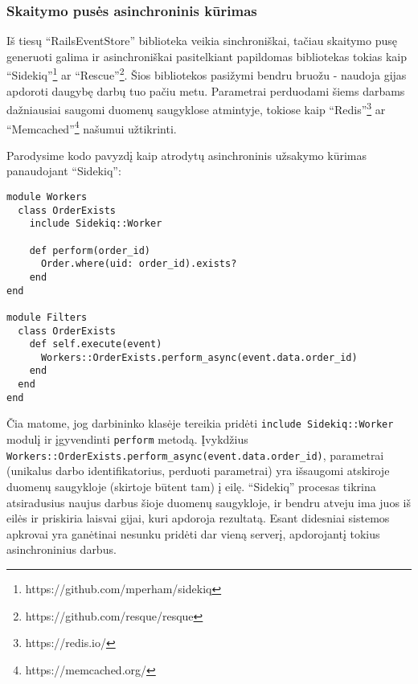 

\subsubsection{Skaitymo pusės asinchroninis kūrimas}

Iš tiesų ``RailsEventStore'' biblioteka veikia sinchroniškai, tačiau skaitymo pusę generuoti galima ir asinchroniškai pasitelkiant papildomas bibliotekas tokias kaip ``Sidekiq''\footnote{https://github.com/mperham/sidekiq} ar ``Rescue''\footnote{https://github.com/resque/resque}. Šios bibliotekos pasižymi bendru bruožu - naudoja gijas apdoroti daugybę darbų tuo pačiu metu. Parametrai perduodami šiems darbams dažniausiai saugomi duomenų saugyklose atmintyje, tokiose kaip ``Redis''\footnote{https://redis.io/} ar ``Memcached''\footnote{https://memcached.org/} našumui užtikrinti.

Parodysime kodo pavyzdį kaip atrodytų asinchroninis užsakymo kūrimas panaudojant ``Sidekiq'':

\begin{lstlisting}
module Workers
  class OrderExists
    include Sidekiq::Worker

    def perform(order_id)
      Order.where(uid: order_id).exists?
    end
end

module Filters
  class OrderExists
    def self.execute(event)
      Workers::OrderExists.perform_async(event.data.order_id)
    end
  end
end
\end{lstlisting}

Čia matome, jog darbininko klasėje tereikia pridėti \lstinline|include Sidekiq::Worker| modulį ir įgyvendinti \lstinline|perform| metodą. Įvykdžius \lstinline|Workers::OrderExists.perform_async(event.data.order_id)|, parametrai (unikalus darbo identifikatorius, perduoti parametrai) yra išsaugomi atskiroje duomenų saugykloje (skirtoje būtent tam) į eilę. ``Sidekiq'' procesas tikrina atsiradusius naujus darbus šioje duomenų saugykloje, ir bendru atveju ima juos iš eilės ir priskiria laisvai gijai, kuri apdoroja rezultatą. Esant didesniai sistemos apkrovai yra ganėtinai nesunku pridėti dar vieną serverį, apdorojantį tokius asinchroninius darbus.

